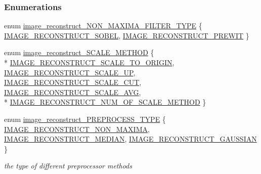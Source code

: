 \subsubsection*{Enumerations}
\begin{DoxyCompactItemize}
\item 
enum \hyperlink{a00013_a426aaaa85fc93215c39f26d2738b9d87}{image\-\_\-reconstruct\-\_\-\-N\-O\-N\-\_\-\-M\-A\-X\-I\-M\-A\-\_\-\-F\-I\-L\-T\-E\-R\-\_\-\-T\-Y\-P\-E} \{ \hyperlink{a00013_a426aaaa85fc93215c39f26d2738b9d87a6a8e1dbe0cc314b132f2e2706daede1e}{I\-M\-A\-G\-E\-\_\-\-R\-E\-C\-O\-N\-S\-T\-R\-U\-C\-T\-\_\-\-S\-O\-B\-E\-L}, 
\hyperlink{a00013_a426aaaa85fc93215c39f26d2738b9d87aa75a25d707f494be996cc5e1f25161cc}{I\-M\-A\-G\-E\-\_\-\-R\-E\-C\-O\-N\-S\-T\-R\-U\-C\-T\-\_\-\-P\-R\-E\-W\-I\-T}
 \}
\item 
enum \hyperlink{a00013_ac27dbc8bff5d1fdaa463a1c1448e134b}{image\-\_\-reconstruct\-\_\-\-S\-C\-A\-L\-E\-\_\-\-M\-E\-T\-H\-O\-D} \{ \\*
\hyperlink{a00013_ac27dbc8bff5d1fdaa463a1c1448e134ba5e1954dcfb78ec0f8f2e922e86201606}{I\-M\-A\-G\-E\-\_\-\-R\-E\-C\-O\-N\-S\-T\-R\-U\-C\-T\-\_\-\-S\-C\-A\-L\-E\-\_\-\-T\-O\-\_\-\-O\-R\-I\-G\-I\-N}, 
\hyperlink{a00013_ac27dbc8bff5d1fdaa463a1c1448e134baa13c9e41d04d587b38ccd22a5537287d}{I\-M\-A\-G\-E\-\_\-\-R\-E\-C\-O\-N\-S\-T\-R\-U\-C\-T\-\_\-\-S\-C\-A\-L\-E\-\_\-\-U\-P}, 
\hyperlink{a00013_ac27dbc8bff5d1fdaa463a1c1448e134baf2ecc0b3d9e21790477928798352fc22}{I\-M\-A\-G\-E\-\_\-\-R\-E\-C\-O\-N\-S\-T\-R\-U\-C\-T\-\_\-\-S\-C\-A\-L\-E\-\_\-\-C\-U\-T}, 
\hyperlink{a00013_ac27dbc8bff5d1fdaa463a1c1448e134ba29162400adfc3650c6ab2e0631e99f66}{I\-M\-A\-G\-E\-\_\-\-R\-E\-C\-O\-N\-S\-T\-R\-U\-C\-T\-\_\-\-S\-C\-A\-L\-E\-\_\-\-A\-V\-G}, 
\\*
\hyperlink{a00013_ac27dbc8bff5d1fdaa463a1c1448e134ba74e9c7ac1cbad8c77f4fa1254dda8875}{I\-M\-A\-G\-E\-\_\-\-R\-E\-C\-O\-N\-S\-T\-R\-U\-C\-T\-\_\-\-N\-U\-M\-\_\-\-O\-F\-\_\-\-S\-C\-A\-L\-E\-\_\-\-M\-E\-T\-H\-O\-D}
 \}
\item 
enum \hyperlink{a00013_ac74b45c91f9169f8834162f730054133}{image\-\_\-reconstruct\-\_\-\-P\-R\-E\-P\-R\-O\-C\-E\-S\-S\-\_\-\-T\-Y\-P\-E} \{ \hyperlink{a00013_ac74b45c91f9169f8834162f730054133a317f8a8322a6c33d2484074f7fdcaf6c}{I\-M\-A\-G\-E\-\_\-\-R\-E\-C\-O\-N\-S\-T\-R\-U\-C\-T\-\_\-\-N\-O\-N\-\_\-\-M\-A\-X\-I\-M\-A}, 
\hyperlink{a00013_ac74b45c91f9169f8834162f730054133ac78b834cacb432cfd12c90c5c75a046a}{I\-M\-A\-G\-E\-\_\-\-R\-E\-C\-O\-N\-S\-T\-R\-U\-C\-T\-\_\-\-M\-E\-D\-I\-A\-N}, 
\hyperlink{a00013_ac74b45c91f9169f8834162f730054133a86ec104c82721cc77e8da13251cc8aee}{I\-M\-A\-G\-E\-\_\-\-R\-E\-C\-O\-N\-S\-T\-R\-U\-C\-T\-\_\-\-G\-A\-U\-S\-S\-I\-A\-N}
 \}
\begin{DoxyCompactList}\small\item\em the type of different preprocessor methods \end{DoxyCompactList}\end{DoxyCompactItemize}
